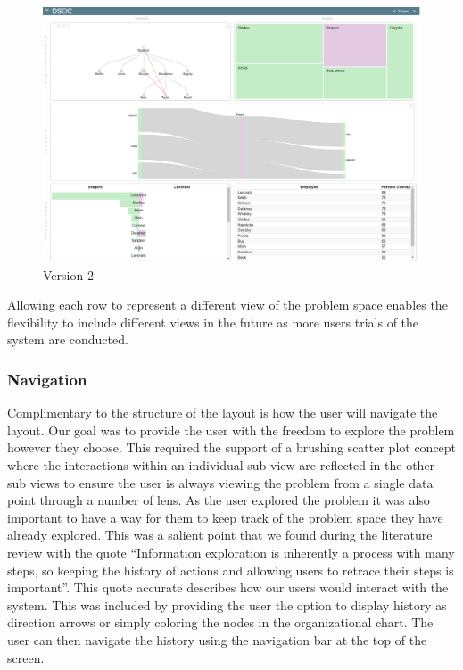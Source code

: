 \documentclass[journal]{vgtc}                %
\begin{document}
\begin{figure}
	\centering
	\includegraphics[width=\columnwidth]{pictures/version2.jpg}
	\caption{Version 2}
	\label{fig:global}
\end{figure}

Allowing each row to represent a different view of the problem space enables the flexibility to include different views in the future as more users trials of the system are conducted.

\subsubsection{Navigation}
Complimentary to the structure of the layout is how the user will navigate the layout.  Our goal was to provide the user with the freedom to explore the problem however they choose.  This required the support of a brushing scatter plot concept where the interactions within an individual sub view are reflected in the other sub views to ensure the user is always viewing the problem from a single data point through a number of lens.
As the user explored the problem it was also important to have a way for them to keep track of the problem space they have already explored.  This was a salient point that we found during the literature review with the quote “Information exploration is inherently a process with many steps, so keeping the history of actions and allowing users to retrace their steps is important”\cite{anafigueiras}.  This quote accurate describes how our users would interact with the system.  This was included by providing the user the option to display history as direction arrows or simply coloring the nodes in the organizational chart.  The user can then navigate the history using the navigation bar at the top of the screen.
\end{document}
